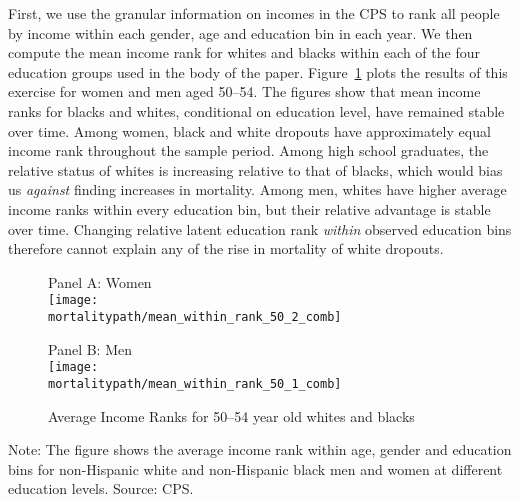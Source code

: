 First, we use the granular information on incomes in the CPS to rank
all people by income within each gender, age and education bin in each
year. We then compute the mean income rank for whites and blacks
within each of the four education groups used in the body of the
paper.  Figure~\ref{fig:income_ranks} plots the results of this
exercise for women and men aged 50--54. The figures show that mean
income ranks for blacks and whites, conditional on education level,
have remained stable over time. Among women, black and white dropouts
have approximately equal income rank throughout the sample
period. Among high school graduates, the relative status of whites is
increasing relative to that of blacks, which would bias us
\textit{against} finding increases in mortality. Among men, whites
have higher average income ranks within every education bin, but their
relative advantage is stable over time.  Changing relative latent
education rank \textit{within} observed education bins therefore
cannot explain any of the rise in mortality of white dropouts.
\clearpage
\begin{figure}[H]
  \caption{Average Income Ranks for 50--54 year old whites and blacks}
  \label{fig:income_ranks}
  \begin{center}
    Panel A: Women \\
      \texttt{[image: \\mortalitypath/mean\_within\_rank\_50\_2\_comb]} \\
  \end{center}
  \begin{center}
    Panel B: Men \\
      \texttt{[image: \\mortalitypath/mean\_within\_rank\_50\_1\_comb]} \\
  \end{center}
\end{figure}

\scriptsize{ Note: The figure shows the average income rank within
  age, gender and education bins for non-Hispanic white and
  non-Hispanic black men and women at different education levels. Source: CPS.}

